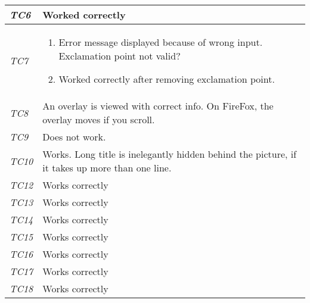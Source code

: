 \begin{minipage}{\linewidth}
\begin{tabular}{ |l|p{70mm}| }
	\it{\cellcolor{gray!25}TC6} & Worked correctly \\ \hline
	\it{\cellcolor{gray!25}TC7} & \begin{enumerate}[label=\alph*)]
	                                \item Error message displayed because of wrong input. Exclamation point not valid?
	                                \item Worked correctly after removing exclamation point.
	                              \end{enumerate}\\ \hline
	\it{\cellcolor{gray!25}TC8} & An overlay is viewed with correct info. On FireFox, the overlay moves if you scroll. \\ \hline
	\it{\cellcolor{gray!25}TC9} & Does not work. \\ \hline
	\it{\cellcolor{gray!25}TC10} & Works. Long title is inelegantly hidden behind the picture, if it takes up more than one line. \\ \hline
	\it{\cellcolor{gray!25}TC12} & Works correctly \\ \hline
	\it{\cellcolor{gray!25}TC13} & Works correctly \\ \hline
	\it{\cellcolor{gray!25}TC14} & Works correctly \\ \hline
	\it{\cellcolor{gray!25}TC15} & Works correctly \\ \hline
	\it{\cellcolor{gray!25}TC16} & Works correctly \\ \hline
	\it{\cellcolor{gray!25}TC17} & Works correctly \\ \hline
	\it{\cellcolor{gray!25}TC18} & Works correctly \\ \hline
	\hline
\end{tabular}
\medskip
\end{minipage}
%
